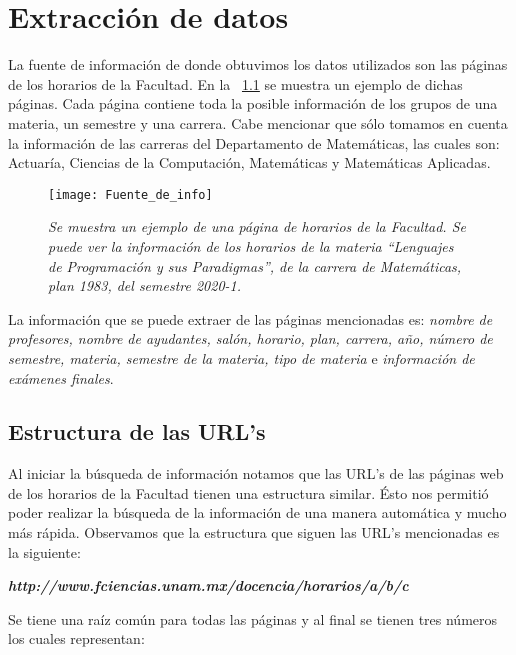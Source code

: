 \chapter{Extracción de datos}

La fuente de información de donde obtuvimos los datos utilizados son las páginas de los horarios de la Facultad. En la \figurename{~\ref{pagFC}} se muestra un ejemplo de dichas páginas. Cada página contiene toda la posible información de los grupos de una materia, un semestre y una carrera. Cabe mencionar que sólo tomamos en cuenta la información de las carreras del Departamento de Matemáticas, las cuales son: Actuaría, Ciencias de la Computación, Matemáticas y Matemáticas Aplicadas.

\begin{figure}[H]
\centering
\texttt{[image: Fuente\_de\_info]} %
\caption[\textit{Página de horarios de la Facultad}]{\textit{Se muestra un ejemplo de una página de horarios de la Facultad. Se puede ver la información de los horarios de la materia ``Lenguajes de Programación y sus Paradigmas'', de la carrera de Matemáticas, plan 1983, del semestre 2020-1.}}\label{pagFC}
\end{figure}

La información que se puede extraer de las páginas mencionadas es: \textit{nombre de profesores, nombre de ayudantes, salón, horario, plan, carrera, año, número de semestre, materia, semestre de la materia, tipo de materia} e \textit{información de exámenes finales}.


\section{Estructura de las URL's}

Al iniciar la búsqueda de información notamos que las URL's de las páginas web de los horarios de la Facultad tienen una estructura similar. Ésto nos permitió poder realizar la búsqueda de la información de una manera automática y mucho más rápida. Observamos que la estructura que siguen las URL's mencionadas es la siguiente:

\begin{center}
\textit{\textbf{http://www.fciencias.unam.mx/docencia/horarios/a/b/c}}
\end{center}

Se tiene una raíz común para todas las páginas y al final se tienen tres números los cuales representan:

